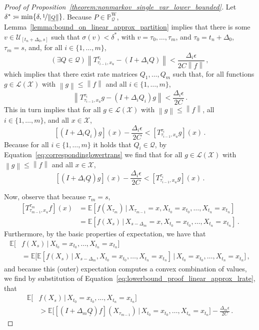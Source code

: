 \documentclass[10pt]{paper}
\theoremstyle{definition}
\newcommand{\states}{\mathcal{X}}
\newcommand{\processes}{\mathbb{P}}
\newcommand{\wprocesses}{\processes^{\mathrm{W}}}
\newcommand{\gambles}{\mathcal{L}}
\newcommand{\gamblesX}{\gambles(\states)}
\newcommand{\rateset}{\mathcal{Q}}
\newcommand{\lrate}{\underline{Q}}
\newcommand{\norm}[1]{\left\lVert #1 \right\rVert}
\newcommand{\coloneqq}{:\!=}
\begin{document}
\begin{proof}[Proof of Proposition~\ref{theorem:nonmarkov_single_var_lower_bounded}]
Let $\delta^*\coloneqq\min\{\delta,\nicefrac{1}{\norm{\lrate}}\}$. 
Because $P\in\wprocesses_\rateset$, Lemma~\ref{lemma:bound_on_linear_approx_partition} implies that there is some $v\in\mathcal{U}_{[t_n+\Delta_0,s]}$ such that $\sigma(v)<\delta^*$, with $v=\tau_0,\ldots,\tau_m$, and $\tau_0=t_n+\Delta_0$, $\tau_m=s$, and, for all $i\in\{1,\ldots,m\}$,
\begin{equation*}
(\exists Q\in\rateset)\norm{T_{\tau_{i-1},x_u}^{\tau_{i}} - (I+\Delta_{i}Q)} < \frac{\Delta_{i}\epsilon}{2C\norm{f}}\,,
\end{equation*}
which implies that there exist rate matrices $Q_{1},\ldots,Q_{m}$ such that, for all functions $g\in\gamblesX$ with $\norm{g}\leq\norm{f}$ and all $i\in\{1,\ldots,m\}$,
\begin{equation*}
\norm{T_{\tau_{i-1},x_u}^{\tau_{i}}g - (I+\Delta_{i}Q_i)g} < \frac{\Delta_{i}\epsilon}{2C}\,.
\end{equation*}
This in turn implies that for all $g\in\gamblesX$ with $\norm{g}\leq\norm{f}$, all $i\in\{1,\ldots,m\}$, and all $x\in\states$,
\begin{equation*}
\left[(I+\Delta_{i}Q_{i})g\right](x) - \frac{\Delta_{i}\epsilon}{2C} < \left[T_{\tau_{i-1},x_u}^{\tau_{i}}g\right](x)\,.
\end{equation*}
Because for all $i\in\{1,\ldots,m\}$ it holds that $Q_i\in\rateset$, by Equation~\eqref{eq:correspondinglowertrans} we find that for all $g\in\gamblesX$ with $\norm{g}\leq\norm{f}$ and all $x\in\states$,
\begin{equation}\label{eq:lowerbound_proof_linear_approx_lrate}
\left[(I+\Delta_{i}\lrate)g\right](x) - \frac{\Delta_{i}\epsilon}{2C} < \left[T_{\tau_{i-1},x_u}^{\tau_{i}}g\right](x)\,.
\end{equation}

Now, observe that because $\tau_m=s$,
\begin{align*}
\left[T_{\tau_{m-1},x_u}^{\tau_{m}}f\right](x) &= \mathbb{E}[f(X_{\tau_m})\,\vert\,X_{\tau_{m-1}}=x,X_{t_0}=x_{t_0},\ldots,X_{t_n}=x_{t_n}]\\
 &= \mathbb{E}[f(X_{s})\,\vert\,X_{s-\Delta_m}=x,X_{t_0}=x_{t_0},\ldots,X_{t_n}=x_{t_n}]\,.
\end{align*}
Furthermore, by the basic properties of expectation, we have that
\begin{align*}
\mathbb{E}[&f(X_s)\,\vert\,X_{t_0}=x_{t_0},\ldots,X_{t_n}=x_{t_n}] \\
 & = \mathbb{E}\bigl[\mathbb{E}[f(X_s)\,\vert\,X_{s-\Delta_m},X_{t_0}=x_{t_0},\ldots,X_{t_n}=x_{t_n}]\,\vert\,X_{t_0}=x_{t_0},\ldots,X_{t_n}=x_{t_n}\bigr]\,,
\end{align*}
and because this (outer) expectation computes a convex combination of values, we find by substitution of Equation~\eqref{eq:lowerbound_proof_linear_approx_lrate}, that
\begin{align*}
\mathbb{E}[&f(X_s)\,\vert\,X_{t_0}=x_{t_0},\ldots,X_{t_n}=x_{t_n}] \\
& > \mathbb{E}\bigl[[(I+\Delta_m\lrate)f](X_{\tau_{m-1}})\,\vert\,X_{t_0}=x_{t_0},\ldots,X_{t_n}=x_{t_n}\bigr] - \frac{\Delta_{m}\epsilon}{2C}\,.
\end{align*}


\end{proof}
\end{document}
